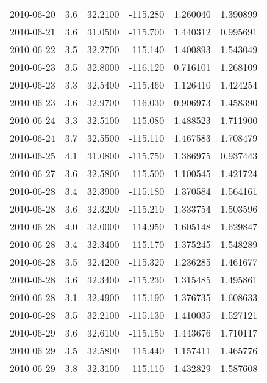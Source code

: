 \begin{tabular}{lrrrrr}
2010-06-20 &       3.6 &  32.2100 &  -115.280 &         1.260040 &         1.390899 \\
2010-06-21 &       3.6 &  31.0500 &  -115.700 &         1.440312 &         0.995691 \\
2010-06-22 &       3.5 &  32.2700 &  -115.140 &         1.400893 &         1.543049 \\
2010-06-23 &       3.5 &  32.8000 &  -116.120 &         0.716101 &         1.268109 \\
2010-06-23 &       3.3 &  32.5400 &  -115.460 &         1.126410 &         1.424254 \\
2010-06-23 &       3.6 &  32.9700 &  -116.030 &         0.906973 &         1.458390 \\
2010-06-24 &       3.3 &  32.5100 &  -115.080 &         1.488523 &         1.711900 \\
2010-06-24 &       3.7 &  32.5500 &  -115.110 &         1.467583 &         1.708479 \\
2010-06-25 &       4.1 &  31.0800 &  -115.750 &         1.386975 &         0.937443 \\
2010-06-27 &       3.6 &  32.5800 &  -115.500 &         1.100545 &         1.421724 \\
2010-06-28 &       3.4 &  32.3900 &  -115.180 &         1.370584 &         1.564161 \\
2010-06-28 &       3.6 &  32.3200 &  -115.210 &         1.333754 &         1.503596 \\
2010-06-28 &       4.0 &  32.0000 &  -114.950 &         1.605148 &         1.629847 \\
2010-06-28 &       3.4 &  32.3400 &  -115.170 &         1.375245 &         1.548289 \\
2010-06-28 &       3.5 &  32.4200 &  -115.320 &         1.236285 &         1.461677 \\
2010-06-28 &       3.6 &  32.3400 &  -115.230 &         1.315485 &         1.495861 \\
2010-06-28 &       3.1 &  32.4900 &  -115.190 &         1.376735 &         1.608633 \\
2010-06-28 &       3.5 &  32.2100 &  -115.130 &         1.410035 &         1.527121 \\
2010-06-29 &       3.6 &  32.6100 &  -115.150 &         1.443676 &         1.710117 \\
2010-06-29 &       3.5 &  32.5800 &  -115.440 &         1.157411 &         1.465776 \\
2010-06-29 &       3.8 &  32.3100 &  -115.110 &         1.432829 &         1.587608 \\

\end{tabular}
